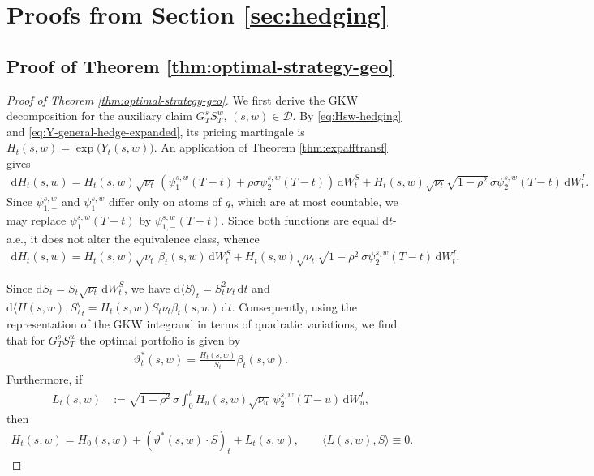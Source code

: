 \documentclass[10pt,a4paper,reqno]{amsart}
\theoremstyle{plain}
\theoremstyle{definition}
\theoremstyle{remark}
\theoremstyle{example}
\begin{document}
\section{Proofs from Section \ref{sec:hedging}}

\subsection{Proof of Theorem \ref{thm:optimal-strategy-geo}}\label{sec:proof-optimal-strategy-geo}

\begin{proof}[Proof of Theorem \ref{thm:optimal-strategy-geo}]
We first derive the GKW decomposition for the auxiliary claim $G_T^sS_T^w$, $(s,w)\in\mathcal D$. By \eqref{eq:Hsw-hedging} and \eqref{eq:Y-general-hedge-expanded}, its pricing martingale is $H_t(s,w) = \exp\bigl(Y_t(s,w)\bigr)$. An application of Theorem \ref{thm:expafftransf} gives
\begin{align*}
    \mathrm dH_t(s,w) = H_t(s,w)\sqrt{\nu_t}\, \left(\psi_{1}^{s,w}(T-t) + \rho\sigma \psi_2^{s,w}(T-t) \right)\, \mathrm dW_t^S + H_t(s,w)\sqrt{\nu_t}\sqrt{1-\rho^2}\, \sigma\psi_2^{s,w}(T-t)\, \mathrm dW_t^I.
\end{align*}
Since $\psi_{1,-}^{s,w}$ and $\psi_{1}^{s,w}$ differ only on atoms of $g$, which are at most countable, we may replace $\psi_{1}^{s,w}(T-t)$ by $\psi_{1,-}^{s,w}(T-t)$. Since both functions are equal $\mathrm{d}t$-a.e., it does not alter the equivalence class, whence
\begin{align}\label{eq:dHsw}
    \mathrm dH_t(s,w) = H_t(s,w)\sqrt{\nu_t}\, \beta_t(s,w)\, \mathrm dW_t^S + H_t(s,w)\sqrt{\nu_t}\sqrt{1-\rho^2}\, \sigma\psi_2^{s,w}(T-t)\, \mathrm dW_t^I.
\end{align} 

Since $\mathrm dS_t = S_t \sqrt{\nu_t}\,\mathrm dW_t^S$, we have $\mathrm d\langle S\rangle_t = S_t^2\nu_t\,\mathrm dt$ and $\mathrm d\langle H(s,w),S\rangle_t = H_t(s,w)S_t\nu_t \beta_t(s,w)\,\mathrm dt$. Consequently, using the representation of the GKW integrand in terms of quadratic variations, we find that for $G_T^sS_T^w$ the optimal portfolio is given by
\begin{align}\label{eq:elementary-gkw-integrand}
    \vartheta_t^*(s,w) = \frac{H_t(s,w)}{S_t} \beta_t(s,w).
\end{align}
Furthermore, if
\begin{align}\label{eq:elementary-residual}
    L_t(s,w) &:= \sqrt{1-\rho^2}\,\sigma \int_0^t H_u(s,w) \sqrt{\nu_u}\, \psi_2^{s,w}(T-u)\, \mathrm dW_u^I,
\end{align}
then
\begin{align}\label{eq: elementary GKW}
    H_t(s,w) = H_0(s,w) + (\vartheta^*(s,w)\cdot S)_t + L_t(s,w), \qquad \langle L(s,w),S\rangle\equiv0.
\end{align}


\end{proof}
\end{document}
